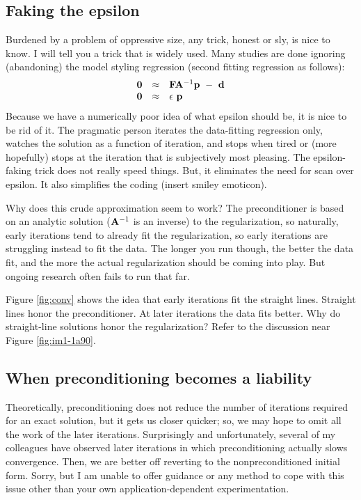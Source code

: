 \subsection{Faking the epsilon}

Burdened by a problem of oppressive size,
any trick, honest or sly, is nice to know.
I will tell you a trick that is widely used.
Many studies are done ignoring (abandoning)
the model styling regression (second fitting regression as follows):
\begin{equation}
\begin{array}{lll}
\label{eq:main5}
\bold 0 &\approx & \bold F \bold A^{-1} \bold p \ -\   \bold d \\
\bold 0 &\approx &           \epsilon \   \bold p 
\end{array}
\end{equation}
Because we have a numerically poor idea of what epsilon should be,
it is nice to be rid of it.
The pragmatic person iterates the data-fitting regression only,
watches the solution as a function of iteration,
and stops when tired
or (more hopefully) stops at the iteration that is subjectively most pleasing.
The epsilon-faking trick does not really speed things.
But,
it eliminates the need for scan over epsilon.
It also simplifies the coding  (insert smiley emoticon).
\par
Why does this crude approximation seem to work?
The preconditioner is based on an analytic solution
($\bold A^{-1}$ is an inverse)
to the regularization,
so naturally, early iterations tend to already fit the regularization,
so early iterations are struggling instead to fit the data.
The longer you run though, the better the data fit,
and the more the actual regularization should be coming into play.
But ongoing research often fails to run that far.
\par
Figure \ref{fig:conv} shows the idea
that early iterations fit the straight lines.
Straight lines honor the preconditioner.
At later iterations the data fits better.
Why do straight-line solutions honor the regularization?
Refer to the discussion near Figure \ref{fig:im1-1a90}.

\subsection{When preconditioning becomes a liability}
Theoretically, preconditioning does not reduce the number of iterations
required for an exact solution,
but it gets us closer quicker;
so,
we may hope to omit all the work of the later iterations.
Surprisingly and unfortunately,
several of my colleagues have observed
later iterations in which preconditioning actually slows convergence.
Then,
we are better off reverting to
the nonpreconditioned initial form.
Sorry, but I am unable to offer guidance
or any method to cope with this issue
other than your own application-dependent experimentation.



